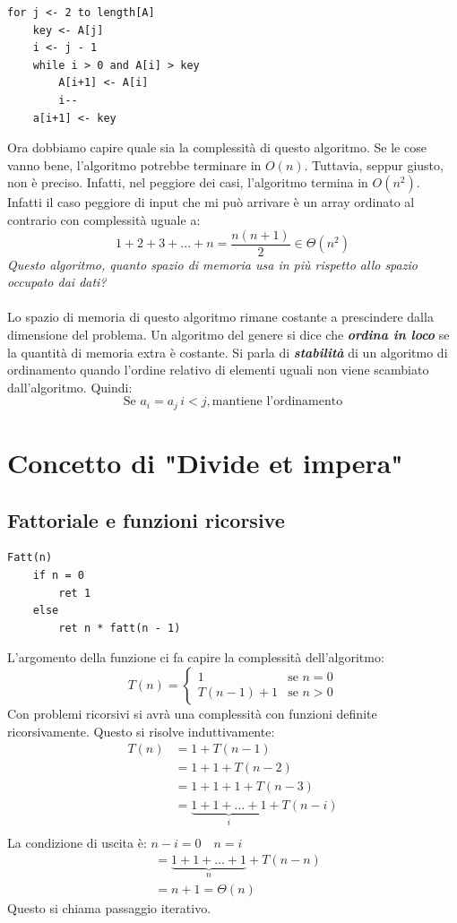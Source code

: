 \documentclass[a4paper]{article}
\begin{document}
\begin{lstlisting}
for j <- 2 to length[A]
    key <- A[j]
    i <- j - 1
    while i > 0 and A[i] > key
        A[i+1] <- A[i]
        i--
    a[i+1] <- key
\end{lstlisting}
Ora dobbiamo capire quale sia la complessità di questo algoritmo. Se le cose vanno bene, l'algoritmo potrebbe terminare in $O(n)$. Tuttavia, seppur giusto, non è preciso. Infatti, nel peggiore dei casi, l'algoritmo termina in $O(n^2)$. Infatti il caso peggiore di input che mi può arrivare è un array ordinato al contrario con complessità uguale a:
\[1 + 2 + 3 + ... + n = \frac{n(n+1)}{2} \in \Theta(n^2)\]
\textit{Questo algoritmo, quanto spazio di memoria usa in più rispetto allo spazio occupato dai dati? }
\\\\
Lo spazio di memoria di questo algoritmo rimane costante a prescindere dalla dimensione del problema. Un algoritmo del genere si dice che \textit{\textbf{ordina in loco}} se la quantità di memoria extra è costante. Si parla di \textit{\textbf{stabilità}} di un algoritmo di ordinamento quando l'ordine relativo di elementi uguali non viene scambiato dall'algoritmo. Quindi:
\[\text{Se } a_i = a_j \, i < j, \text{mantiene l'ordinamento}\]


\section{Concetto di "Divide et impera"}

\subsection{Fattoriale e funzioni ricorsive}

\begin{lstlisting}
Fatt(n) 
    if n = 0
        ret 1
    else
        ret n * fatt(n - 1)
\end{lstlisting}

L'argomento della funzione ci fa capire la complessità dell'algoritmo:
\[
  T(n) = \begin{cases}
    1 & \text{se } n = 0 \\
    T(n - 1) + 1 & \text{se } n > 0
  \end{cases}
\] 
Con problemi ricorsivi si avrà una complessità con funzioni definite ricorsivamente.
Questo si risolve induttivamente:
\[
  \begin{aligned}
    T(n) & = 1 + T(n-1)\\
         & = 1 + 1 + T(n-2)\\
         & = 1 + 1 + 1 + T(n-3)\\
         & = \underbrace{1 + 1 + \ldots + 1}_{i} + T(n-i)\\
  \end{aligned}
\] 
La condizione di uscita è: \( n-i = 0 \quad n = i \) 
\[
\begin{aligned}
         & = \underbrace{1 + 1 + \ldots + 1}_{n} + T(n-n)\\
         & = n + 1 = \Theta(n)
\end{aligned}
\] 
Questo si chiama passaggio iterativo.
\end{document}
